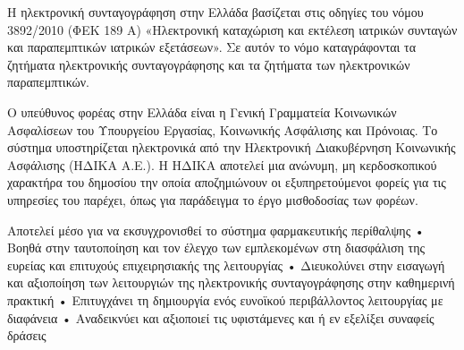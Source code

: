		Η ηλεκτρονική συνταγογράφηση στην Ελλάδα βασίζεται στις οδηγίες του νόμου 3892/2010 (ΦΕΚ 189 Α) «Ηλεκτρονική καταχώριση και εκτέλεση ιατρικών συνταγών και παραπεμπτικών ιατρικών εξετάσεων». Σε αυτόν το νόμο καταγράφονται τα ζητήματα ηλεκτρονικής συνταγογράφησης και τα ζητήματα των ηλεκτρονικών παραπεμπτικών.
		
		Ο υπεύθυνος φορέας στην Ελλάδα είναι η Γενική Γραμματεία Κοινωνικών Ασφαλίσεων του Υπουργείου Εργασίας, Κοινωνικής Ασφάλισης και Πρόνοιας. Το σύστημα υποστηρίζεται ηλεκτρονικά από την Ηλεκτρονική Διακυβέρνηση Κοινωνικής Ασφάλισης (ΗΔΙΚΑ Α.Ε.). Η ΗΔΙΚΑ αποτελεί μια ανώνυμη, μη κερδοσκοπικού χαρακτήρα του δημοσίου την οποία αποζημιώνουν οι εξυπηρετούμενοι φορείς για τις υπηρεσίες του παρέχει, όπως για παράδειγμα το έργο μισθοδοσίας των φορέων.  \cite{idika}
		


Αποτελεί μέσο για να εκσυγχρονισθεί το σύστημα φαρμακευτικής περίθαλψης
• Βοηθά στην ταυτοποίηση και τον έλεγχο των εμπλεκομένων στη διασφάλιση της
ευρείας και επιτυχούς επιχειρησιακής της λειτουργίας
• Διευκολύνει στην εισαγωγή και αξιοποίηση των λειτουργιών της ηλεκτρονικής
συνταγογράφησης στην καθημερινή πρακτική
• Επιτυγχάνει τη δημιουργία ενός ευνοϊκού περιβάλλοντος λειτουργίας με
διαφάνεια
• Αναδεικνύει και αξιοποιεί τις υφιστάμενες και ή εν εξελίξει συναφείς δράσεις


